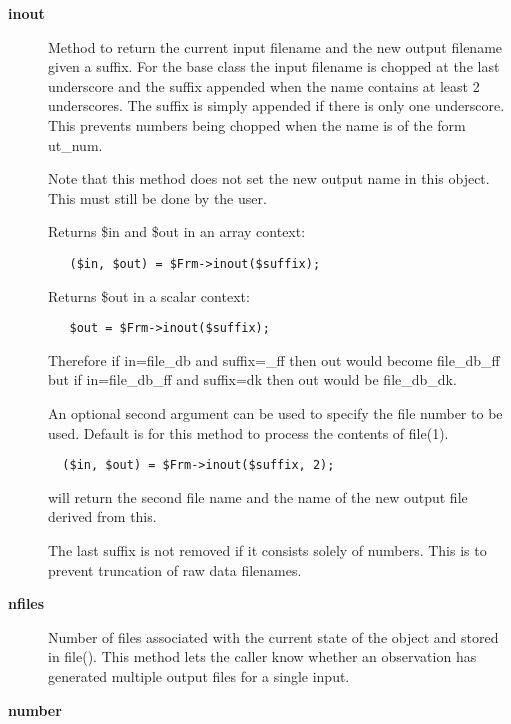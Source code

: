 \begin{description}
\item[\textbf{inout}] \mbox{}

Method to return the current input filename and the new output
filename given a suffix.  For the base class the input filename is
chopped at the last underscore and the suffix appended when the name
contains at least 2 underscores. The suffix is simply appended if
there is only one underscore. This prevents numbers being chopped when
the name is of the form ut\_num.



Note that this method does not set the new output name in this
object. This must still be done by the user.



Returns \$in and \$out in an array context:

\begin{verbatim}
   ($in, $out) = $Frm->inout($suffix);
\end{verbatim}


Returns \$out in a scalar context:

\begin{verbatim}
   $out = $Frm->inout($suffix);
\end{verbatim}


Therefore if in=file\_db and suffix=\_ff then out would
become file\_db\_ff but if in=file\_db\_ff and suffix=dk then
out would be file\_db\_dk.



An optional second argument can be used to specify the
file number to be used. Default is for this method to process
the contents of file(1).

\begin{verbatim}
  ($in, $out) = $Frm->inout($suffix, 2);
\end{verbatim}


will return the second file name and the name of the new output
file derived from this.



The last suffix is not removed if it consists solely of numbers.
This is to prevent truncation of raw data filenames.

\item[\textbf{nfiles}] \mbox{}

Number of files associated with the current state of the object and
stored in file(). This method lets the caller know whether an
observation has generated multiple output files for a single input.

\item[\textbf{number}] \mbox{}


\end{description}
